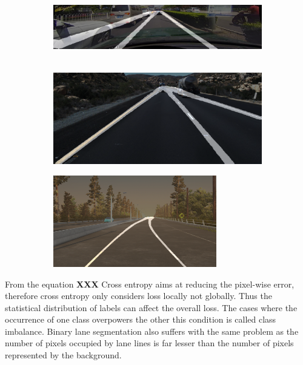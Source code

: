        \begin{figure}[h]
       \caption{Initial binary lane segmentation results: (a) SCNN (Res18+CULane), (b) SCNN (Res18 + TuSimple) and (c) RESA (Res18 + sim3d)}
        \centering
        \begin{subfigure}{0.6\textwidth}
        \includegraphics[width=1.2\linewidth, height=3cm]{images/SCNN_res_culane.png} 
        \caption{}
        \label{fig:subim1}
        \end{subfigure}
        \begin{subfigure}{0.4\textwidth}
        \includegraphics[width=1\linewidth, height=4cm]{images/SCNN_res_tusimple.png}
        \caption{}
        \label{fig:subim2}
        \end{subfigure}
        \begin{subfigure}{0.4\textwidth}
        \includegraphics[width=1\linewidth, height=4cm]{images/Resa_r18_sim3d.png}
        \caption{}
        \label{fig:subim2}
        \end{subfigure}
        \label{fig:image2}
        \end{figure}
    
    From the equation \textbf{XXX} Cross entropy aims at reducing the pixel-wise error, therefore cross entropy only considers loss locally not globally. Thus the statistical distribution of labels can affect the overall loss. The cases where the occurrence of one class overpowers the other this condition is called class imbalance. Binary lane segmentation also suffers with the same problem as the number of pixels occupied by lane lines is far lesser than the number of pixels represented by the background. 
    
